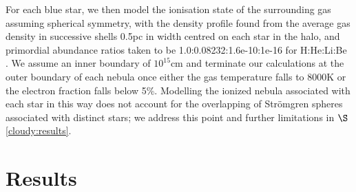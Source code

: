 \documentclass[graphics, twocolumn, usenatbib]{mn2e}
\begin{document}
For each blue star, we then model the ionisation state of the surrounding gas assuming spherical symmetry, with the density profile found from the average gas density in successive shells 0.5pc in width centred on each star in the halo, and primordial abundance ratios taken to be 1.0:0.08232:1.6e-10:1e-16 for H:He:Li:Be \citep[consistent with the results of the][table 2, see {\sc cloudy} documentation for further discussion]{Planck_2014}. We assume an inner boundary of $10^{15}$cm and terminate our calculations at the outer boundary of each nebula once either the gas temperature falls to 8000K or the electron fraction falls below 5\%. Modelling the ionized nebula associated with each star in this way does not account for the overlapping of Str{\"o}mgren spheres associated with distinct stars; we address this point and further limitations in $\S$\ref{cloudy:results}.


\section{Results}
\end{document}
